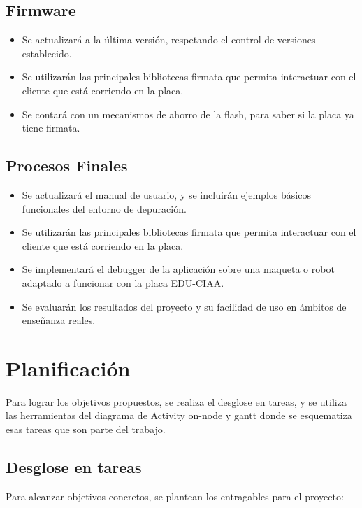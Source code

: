 \subsection{Firmware}

\begin{itemize}
	\item Se actualizará a la última versión, respetando el control de versiones establecido.	
	\item Se utilizarán las principales bibliotecas firmata que permita interactuar con el cliente que está corriendo en la placa.
	\item Se contará con un mecanismos de ahorro de la flash, para saber si la placa ya tiene firmata.
\end{itemize}

\subsection{Procesos Finales}

\begin{itemize}
	\item Se actualizará el manual de usuario, y se incluirán ejemplos básicos funcionales del entorno de depuración.	
	\item Se utilizarán las principales bibliotecas firmata que permita interactuar con el cliente que está corriendo en la placa.
	\item Se implementará el debugger de la aplicación sobre una maqueta o robot adaptado a funcionar con la placa EDU-CIAA.
	\item Se evaluarán los resultados del proyecto y su facilidad de uso en ámbitos de enseñanza reales.
\end{itemize}

\section{Planificación}
\label{sec:ejemplo}

Para lograr los objetivos propuestos, se realiza el desglose en tareas, y se utiliza las herramientas del diagrama de Activity on-node y gantt donde se esquematiza esas tareas que son parte del trabajo.

\subsection{Desglose en tareas} 

Para alcanzar objetivos concretos, se plantean los entragables para el proyecto:

